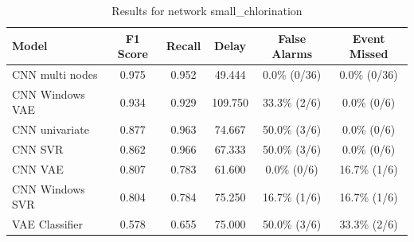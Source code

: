 \begin{table}
\caption{Results for network small_chlorination}
\label{tab:results-small_chlorination}
\begin{tabular}{lccccc}
\toprule
Model & F1 Score & Recall & Delay & False Alarms & Event Missed \\
\midrule
CNN multi nodes & 0.975 & 0.952 & 49.444 & 0.0\% (0/36) & 0.0\% (0/36) \\
CNN Windows VAE & 0.934 & 0.929 & 109.750 & 33.3\% (2/6) & 0.0\% (0/6) \\
CNN univariate & 0.877 & 0.963 & 74.667 & 50.0\% (3/6) & 0.0\% (0/6) \\
CNN SVR & 0.862 & 0.966 & 67.333 & 50.0\% (3/6) & 0.0\% (0/6) \\
CNN VAE & 0.807 & 0.783 & 61.600 & 0.0\% (0/6) & 16.7\% (1/6) \\
CNN Windows SVR & 0.804 & 0.784 & 75.250 & 16.7\% (1/6) & 16.7\% (1/6) \\
VAE Classifier & 0.578 & 0.655 & 75.000 & 50.0\% (3/6) & 33.3\% (2/6) \\
\bottomrule
\end{tabular}
\end{table}
